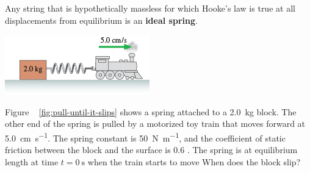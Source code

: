 Any string that is hypothetically massless for which Hooke's law is true
at all displacements from equilibrium is an \textbf{ideal spring}.
\begin{Exercise}[title={Pull until it slips}]
    \begin{center}
        \includegraphics[totalheight=0.2\textheight]{../figures/pull-until-it-slips.png}
        \label{fig:pull-until-it-slips}
    \end{center}

    Figure ~%
    \ref{fig:pull-until-it-slips} shows a spring attached to a \SI{2.0}{\kilo\gram}
    block.  The other end of the spring is pulled by a motorized toy
    train that moves forward at \SI{5.0}{\centi\metre\per\second}.  The
    spring constant is \SI{50}{\newton\per\metre}, and the coefficient
    of static friction between the block and the surface is
    $
        0.6
    $%
.    The spring is at equilibrium length at time
    $
        t = \qty{0}{\second}
    $ when the train starts to move When does the block slip?
\end{Exercise}
